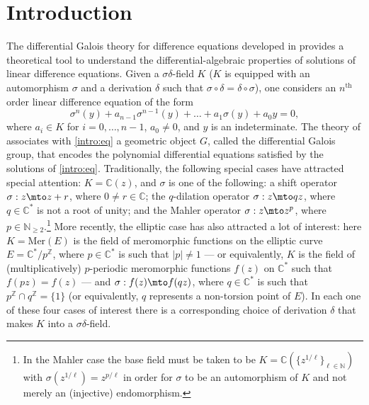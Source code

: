 \section{Introduction}

The differential Galois theory for difference equations developed in \cite{HS} provides a theoretical tool to understand the differential-algebraic properties of solutions of linear difference equations. Given a $\sigma\delta$-field $K$ (\ie $K$ is equipped with an automorphism $\sigma$ and a derivation $\delta$ such that $\sigma\circ\delta=\delta\circ\sigma$), one considers an $n^\text{th}$ order linear difference equation of the form\vspace*{-3pt}
\begin{equation}\label{intro:eq} \sigma^n(y)+a_{n-1}\sigma^{n-1}(y)+\dots+a_1\sigma(y)+a_0y=0,\end{equation}
where $a_i\in K$ for $i=0,\dots,n-1$, $a_0\neq 0$, and $y$ is an indeterminate. The theory of \cite{HS} associates with \eqref{intro:eq} a geometric object $G$, called the differential Galois group, that encodes the polynomial differential equations satisfied by the solutions of \eqref{intro:eq}. Traditionally, the following special cases have attracted special attention: $K=\mathbb{C}(z)$, and $\sigma$ is one of the following: a shift operator $\sigma:z\mto z+r$, where $0\neq r\in\mathbb{C}$; the $q$-dilation operator $\sigma: z\mto qz$, where $q\in\mathbb{C}^*$ is not a root of unity; and the Mahler operator $\sigma : z\mto z^p$, where $p\in\mathbb{N}_{\geq 2}$.\footnote{In the Mahler case the base field must be taken to be $K=\mathbb{C}(\{z^{1/\ell}\}_{\ell\in\mathbb{N}})$ with $\sigma(z^{1/\ell})=z^{p/\ell}$ in order for $\sigma$ to be an automorphism of $K$ and not merely an (injective) endomorphism.} More recently, the elliptic case has also attracted a lot of interest: here $K=\mathrm{Mer}(E)$ is the field of meromorphic functions on the elliptic curve $E=\mathbb{C}^*/p^\mathbb{Z}$, where $p\in\mathbb{C}^*$ is such that $|p|\neq 1$ --- or equivalently, $K$ is the field of (multiplicatively) $p$-periodic meromorphic functions $f(z)$ on $\mathbb{C}^*$ such that $f(pz)=f(z)$ --- and $\sigma:f(z)\mto f(qz)$, where $q\in\mathbb{C}^*$ is such that $p^\mathbb{Z}\cap q^\mathbb{Z}=\{1\}$ (or equivalently, $q$ represents a non-torsion point of $E$). In each one of these four cases of interest there is a corresponding choice of derivation $\delta$ that makes $K$ into a $\sigma\delta$-field.

